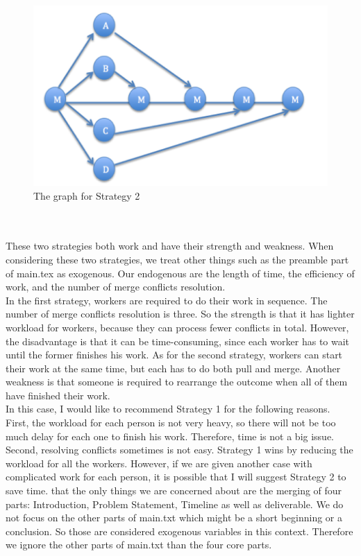 \documentclass[12pt]{article}
\begin{document}
\\
\\
\begin{figure}[h]
    \begin{center}
        \includegraphics[scale=0.6]{s2.png}
    \end{center}
    \caption{The graph for Strategy 2}
    \label{fig:branch}
\end{figure}
\\
\\
These two strategies both work and have their strength and weakness. When considering these two strategies, we treat other things such as the preamble part of main.tex as exogenous. Our endogenous are the length of time, the efficiency of work, and the number of merge conflicts resolution. \\
In the first strategy, workers are required to do their work in sequence. The number of merge conflicts resolution is three. So the strength is that it has lighter workload for workers, because they can process fewer conflicts in total. However, the disadvantage is that it can be time-consuming, since each worker has to wait until the former finishes his work. As for the second strategy, workers can start their work at the same time, but each has to do both pull and merge. Another weakness is that someone is required to rearrange the outcome when all of them have finished their work. \\
In this case, I would like to recommend Strategy 1 for the following reasons. First, the workload for each person is not very heavy, so there will not be too much delay for each one to finish his work. Therefore, time is not a big issue. Second, resolving conflicts sometimes is not easy. Strategy 1 wins by reducing the workload for all the workers. However, if we are given another case with complicated work for each person, it is possible that I will suggest Strategy 2 to save time.
that the only things we are concerned about are the merging of four parts: Introduction, Problem
Statement, Timeline as well as deliverable. We do not focus on the other parts of main.txt which
might be a short beginning or a conclusion. So those are considered exogenous variables in this
context. Therefore we ignore the other parts of main.txt than the four core parts.
\end{document}
